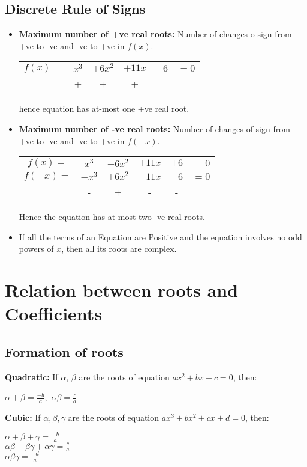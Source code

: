 \documentclass[11pt,a4paper,landscape]{article}
\begin{document}
\begin{multicols*}{3}
	\subsection{Discrete Rule of Signs}
	\begin{itemize}
	\item \textbf{Maximum number of +ve real roots:} Number of changes o sign from +ve to -ve and -ve to +ve in $f(x)$.
	\begin{tabular}{cccccc}
	$f(x)=$ & $x^3$ & $+6x^2$ & $+11x$ & $-6$ & $=0$ \\ 
	  & + & + & + & - &   \\ 
	\end{tabular}
	hence equation has at-most one +ve real root.
	\item \textbf{Maximum number of -ve real roots:} Number of changes of sign from +ve to -ve and -ve to +ve in $f(-x)$.
	\begin{tabular}{cccccc}
	$f(x)=$ & $x^3$ & $-6x^2$ & $+11x$ & $+6$ & $=0$ \\ 
	$f(-x)=$ & $-x^3$ & $+6x^2$ & $-11x$ & $-6$ & $=0$ \\ 
	  & - & + & - & - &   \\
	\end{tabular}
	Hence the equation has at-most two -ve real roots.
	\item If all the terms of an Equation are Positive and the equation involves no odd powers of $x$, then all its roots are complex.
	\end{itemize}
	
\section{Relation between roots and Coefficients}
	\subsection{Formation of roots}
	\textbf{Quadratic:} If $\alpha$, $\beta$ are the roots of equation $ax^2+bx+c=0$, then:\\
	\begin{center}
	$\alpha+\beta = \frac{-b}{a}$,\, $\alpha\beta = \frac{c}{a}$
	\end{center}
	
	\textbf{Cubic:} If $\alpha, \beta, \gamma$ are the roots of equation $ax^3+bx^2+cx+d=0$, then:\\
	\begin{center}
	$\alpha+\beta+\gamma = \frac{-b}{a}$\\
	$\alpha\beta+\beta\gamma+\alpha\gamma = \frac{c}{a}$\\
	$\alpha\beta\gamma = \frac{-d}{a}$
	\end{center}

\end{multicols*}
\end{document}
